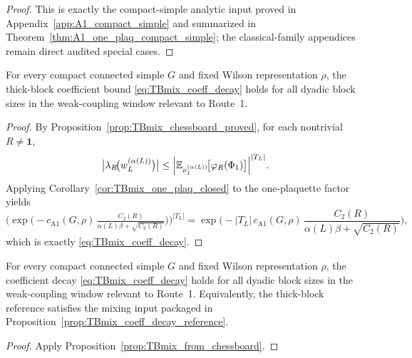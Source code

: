 \begin{proof}
This is exactly the compact-simple analytic input proved in Appendix~\ref{app:A1_compact_simple} and summarized in Theorem~\ref{thm:A1_one_plaq_compact_simple}; the classical-family appendices remain direct audited special cases.
\end{proof}

\begin{proposition}\label{prop:TBmix_from_chessboard}
For every compact connected simple $G$ and fixed Wilson representation $\rho$, the thick-block coefficient bound \eqref{eq:TBmix_coeff_decay} holds for all dyadic block sizes in the weak-coupling window relevant to Route~1.
\end{proposition}

\begin{proof}
By Proposition~\ref{prop:TBmix_chessboard_proved}, for each nontrivial $R\neq\mathbf 1$,
\[
\bigl|\lambda_R\!\bigl(w_L^{(\alpha(L))}\bigr)\bigr|
\le
\Bigl|\mathbb E_{\nu_1^{(\alpha(L))}}\!\big[\varphi_R(\Phi_1)\big]\Bigr|^{|T_L|}.
\]
Applying Corollary~\ref{cor:TBmix_one_plaq_closed} to the one-plaquette factor yields
\[
\Big(\exp\!\big(-c_{\mathrm{A1}}(G,\rho)\,\tfrac{C_2(R)}{\alpha(L)\beta+\sqrt{C_2(R)}}\big)\Big)^{|T_L|}
=
\exp\!\Big(-|T_L|\,c_{\mathrm{A1}}(G,\rho)\,\frac{C_2(R)}{\alpha(L)\beta+\sqrt{C_2(R)}}\Big),
\]
which is exactly \eqref{eq:TBmix_coeff_decay}.
\end{proof}

\begin{corollary}\label{cor:TBmix_heatkernel_closed}
For every compact connected simple $G$ and fixed Wilson representation $\rho$, the coefficient decay \eqref{eq:TBmix_coeff_decay} holds for all dyadic block sizes in the weak-coupling window relevant to Route~1.
Equivalently, the thick-block reference satisfies the mixing input packaged in Proposition~\ref{prop:TBmix_coeff_decay_reference}.
\end{corollary}

\begin{proof}
Apply Proposition~\ref{prop:TBmix_from_chessboard}.
\end{proof}

